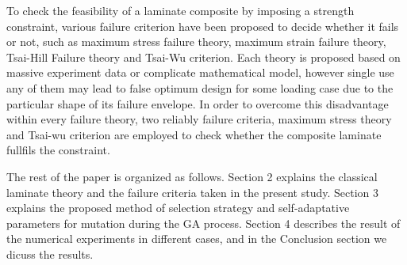 To check the feasibility of a laminate composite by imposing a strength
constraint, various failure criterion have been proposed to decide whether it
fails or not, such as  maximum stress failure theory, maximum strain failure
theory, Tsai-Hill Failure theory and Tsai-Wu criterion. Each theory is proposed
based on massive experiment data or complicate mathematical model, however
single use any of them may lead to false optimum design for some loading case
due to the particular shape of its failure envelope. In order to overcome this
disadvantage within every failure theory, two reliably failure criteria, maximum
stress theory and Tsai-wu criterion are employed to check whether the composite
laminate fullfils the constraint.


The rest of the paper is organized as follows. Section 2 explains the classical laminate theory and
the failure criteria taken in the present study.  Section 3 explains the proposed method of
selection strategy and self-adaptative parameters for mutation during the GA process. Section 4
describes the result of the numerical experiments in different cases, and in the Conclusion section
we dicuss the results.






